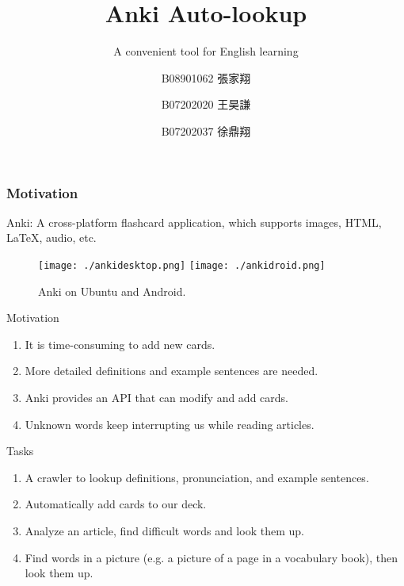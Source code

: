 \documentclass{beamer}
\title{Anki Auto-lookup}
\subtitle{A convenient tool for English learning}
\author[張家翔, 王昊謙, 徐鼎翔]
{B08901062 張家翔\inst{1} \and 
B07202020 王昊謙\inst{2} \and 
B07202037 徐鼎翔 \inst{2}}
\institute[NTU] %
{
	\inst{1}%
	Department of Electrical Engineering\\
	National Taiwan University
	\and
	\inst{2}%
	Department of Physics\\
	National Taiwan University
}
\begin{document}
\frame{\titlepage} 

\begin{frame}
	\frametitle{Motivation}
	Anki: A cross-platform flashcard application, which supports images, HTML,
	\LaTeX, audio, etc.
	\begin{figure}[h]
		\centering
		\texttt{[image: ./ankidesktop.png]}
		\texttt{[image: ./ankidroid.png]}
		\caption{Anki on Ubuntu and Android.
		\label{fig:anki}}
	\end{figure}
\end{frame}

\begin{frame}{Motivation}
	\begin{enumerate}
		\item It is time-consuming to add new cards.
		\item More detailed definitions and example sentences are needed.
		\item Anki provides an API that can modify and add cards.
		\item Unknown words keep interrupting us while reading articles.
	\end{enumerate}
\end{frame}

\begin{frame}{Tasks}
	\begin{enumerate}
		\item A crawler to lookup definitions, pronunciation, and example
			sentences.
		\item Automatically add cards to our deck.
		\item Analyze an article, find difficult words and look them up.
		\item Find words in a picture (e.g. a picture of a page in a vocabulary
			book), then look them up.
	\end{enumerate}
	
\end{frame}
\end{document}
